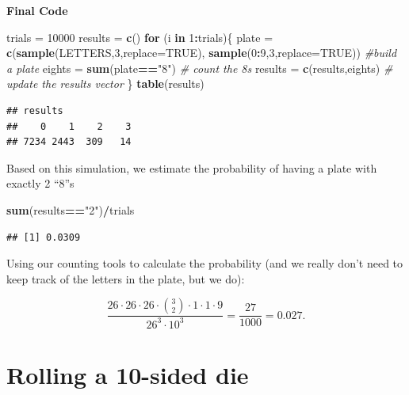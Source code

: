 \documentclass[
]{book}
\newenvironment{Shaded}{\begin{snugshade}}{\end{snugshade}}
\newcommand{\AttributeTok}[1]{\textcolor[rgb]{0.13,0.29,0.53}{#1}}
\newcommand{\CommentTok}[1]{\textcolor[rgb]{0.56,0.35,0.01}{\textit{#1}}}
\newcommand{\ConstantTok}[1]{\textcolor[rgb]{0.56,0.35,0.01}{#1}}
\newcommand{\ControlFlowTok}[1]{\textcolor[rgb]{0.13,0.29,0.53}{\textbf{#1}}}
\newcommand{\DecValTok}[1]{\textcolor[rgb]{0.00,0.00,0.81}{#1}}
\newcommand{\FunctionTok}[1]{\textcolor[rgb]{0.13,0.29,0.53}{\textbf{#1}}}
\newcommand{\NormalTok}[1]{#1}
\newcommand{\OtherTok}[1]{\textcolor[rgb]{0.56,0.35,0.01}{#1}}
\newcommand{\SpecialCharTok}[1]{\textcolor[rgb]{0.81,0.36,0.00}{\textbf{#1}}}
\newcommand{\StringTok}[1]{\textcolor[rgb]{0.31,0.60,0.02}{#1}}
\theoremstyle{definition}
\theoremstyle{definition}
\theoremstyle{definition}
\theoremstyle{definition}
\theoremstyle{remark}
\begin{document}
\textbf{Final Code}

\begin{Shaded}
\begin{Highlighting}[]
\NormalTok{trials }\OtherTok{=} \DecValTok{10000}
\NormalTok{results }\OtherTok{=} \FunctionTok{c}\NormalTok{()}
\ControlFlowTok{for}\NormalTok{ (i }\ControlFlowTok{in} \DecValTok{1}\SpecialCharTok{:}\NormalTok{trials)\{}
\NormalTok{  plate }\OtherTok{=} \FunctionTok{c}\NormalTok{(}\FunctionTok{sample}\NormalTok{(LETTERS,}\DecValTok{3}\NormalTok{,}\AttributeTok{replace=}\ConstantTok{TRUE}\NormalTok{),}
            \FunctionTok{sample}\NormalTok{(}\DecValTok{0}\SpecialCharTok{:}\DecValTok{9}\NormalTok{,}\DecValTok{3}\NormalTok{,}\AttributeTok{replace=}\ConstantTok{TRUE}\NormalTok{)) }\CommentTok{\#build a plate}
\NormalTok{  eights }\OtherTok{=} \FunctionTok{sum}\NormalTok{(plate}\SpecialCharTok{==}\StringTok{"8"}\NormalTok{) }\CommentTok{\# count the 8s}
\NormalTok{  results }\OtherTok{=} \FunctionTok{c}\NormalTok{(results,eights) }\CommentTok{\# update the results vector}
\NormalTok{\}}
\FunctionTok{table}\NormalTok{(results)}
\end{Highlighting}
\end{Shaded}

\begin{verbatim}
## results
##    0    1    2    3 
## 7234 2443  309   14
\end{verbatim}

Based on this simulation, we estimate the probability of having a plate with exactly 2 ``8''s

\begin{Shaded}
\begin{Highlighting}[]
\FunctionTok{sum}\NormalTok{(results}\SpecialCharTok{==}\StringTok{"2"}\NormalTok{)}\SpecialCharTok{/}\NormalTok{trials}
\end{Highlighting}
\end{Shaded}

\begin{verbatim}
## [1] 0.0309
\end{verbatim}

Using our counting tools to calculate the probability (and we really don't need to keep track of the letters in the plate, but we do):

\[\frac{26\cdot 26\cdot 26 \cdot \binom{3}{2} \cdot 1 \cdot 1 \cdot 9}{26^3\cdot 10^3}= \frac{27}{1000} = 0.027.\]

\section{Rolling a 10-sided die}\label{10sided-die-R}
\end{document}

